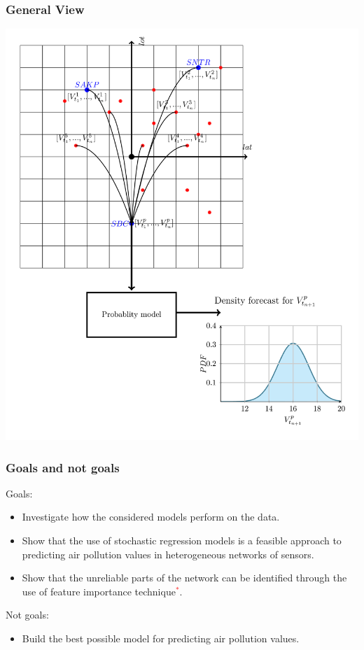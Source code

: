 \documentclass[18pt]{beamer}
\begin{document}
\begin{frame}
  \frametitle{General View}
  \begin{center}
    \includegraphics[scale=0.10]{images/general_system}
  \end{center}
\end{frame}

\begin{frame}
  \frametitle{Goals and not goals}
  Goals:
  \begin{itemize}
  \item Investigate how the considered models perform on the data.
  \item Show that the use of stochastic regression models is a feasible approach to predicting air pollution values in heterogeneous networks of sensors.
  \item Show that the unreliable parts of the network can be identified through the use of feature importance technique\textcolor{red}{$^*$}.
  \end{itemize}
  Not goals:
  \begin{itemize}
  \item Build the best possible model for predicting air pollution values.
  \end{itemize}
\end{frame}
\end{document}
